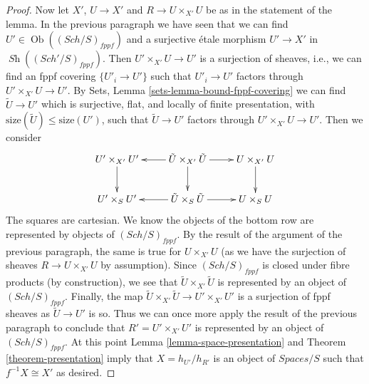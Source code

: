 \documentclass[10pt,a4paper]{amsart}
\theoremstyle{plain}
\theoremstyle{definition}
\theoremstyle{remark}
\numberwithin{equation}{subsection}
\def\Sch{\mathit{Sch}}
\def\Ob{\mathop{\mathrm{Ob}}\nolimits}
\def\Sh{\mathop{\mathit{Sh}}\nolimits}
\begin{document}
\begin{proof}
\medskip\noindent
Now let $X'$, $U \to X'$ and $R \to U \times_{X'} U$ be as in the
statement of the lemma. In the previous paragraph we have seen that
we can find $U' \in \Ob((\Sch/S)_{fppf})$ and a surjective \'etale morphism
$U' \to X'$ in $\Sh((\Sch'/S)_{fppf})$. Then
$U' \times_{X'} U \to U'$ is a surjection of sheaves, i.e., we can find an fppf
covering $\{U'_i \to U'\}$ such that $U'_i \to U'$ factors through
$U' \times_{X'} U \to U'$.
By Sets, Lemma \ref{sets-lemma-bound-fppf-covering}
we can find
$\tilde U \to U'$
which is surjective, flat, and locally of finite presentation,
with $\text{size}(\tilde U) \leq \text{size}(U')$,
such that $\tilde U \to U'$ factors through
$U' \times_{X'} U \to U'$. Then we consider
$$
\xymatrix{
U' \times_{X'} U' \ar[d] &
\tilde U \times_{X'} \tilde U  \ar[l] \ar[d] \ar[r] &
U \times_{X'} U \ar[d] \\
U' \times_S U' & \tilde U \times_S \tilde U \ar[l] \ar[r] & U \times_S U
}
$$
The squares are cartesian. We know the objects of the bottom row
are represented by objects of $(\Sch/S)_{fppf}$. By the result of the
argument of the previous paragraph, the same is true for $U \times_{X'} U$
(as we have the surjection of sheaves $R \to U \times_{X'} U$
by assumption). Since $(\Sch/S)_{fppf}$ is closed under fibre
products (by construction), we see that $\tilde U \times_{X'} \tilde U$
is represented by an object of $(\Sch/S)_{fppf}$. Finally, the
map $\tilde U \times_{X'} \tilde U \to U' \times_{X'} U'$ is
a surjection of fppf sheaves as $\tilde U \to U'$ is so.
Thus we can once more apply the result of the previous paragraph
to conclude that $R' = U' \times_{X'} U'$ is represented by an object
of $(\Sch/S)_{fppf}$. At this point
Lemma \ref{lemma-space-presentation} and
Theorem \ref{theorem-presentation} imply that $X = h_{U'}/h_{R'}$
is an object of $\textit{Spaces}/S$ such that $f^{-1}X \cong X'$
as desired.
\end{proof}
\end{document}
